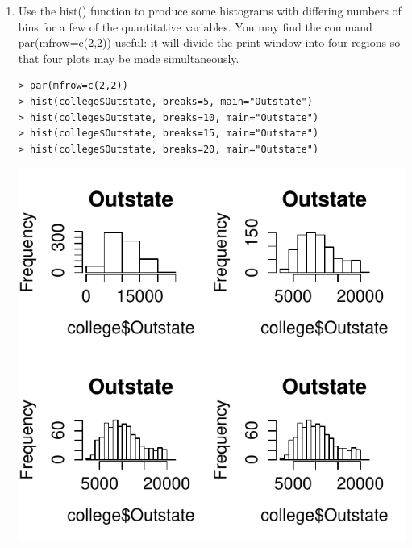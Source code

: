 \documentclass[11pt]{article}
\providecommand{\code}[1]{{\color{red}\ttfamily #1}}
\begin{document}
\begin{enumerate}
\begin{enumerate}
\begin{enumerate}
\item Use the \code{hist()} function to produce some histograms with differing numbers of bins for a few of the quantitative variables.  You may find the command \code{par(mfrow=c(2,2))} useful:  it will divide the print window into four regions so that four plots may be made simultaneously.

\begin{lstlisting}
> par(mfrow=c(2,2))
> hist(college$Outstate, breaks=5, main="Outstate")
> hist(college$Outstate, breaks=10, main="Outstate")
> hist(college$Outstate, breaks=15, main="Outstate")
> hist(college$Outstate, breaks=20, main="Outstate")
\end{lstlisting}
\begin{center}
\includegraphics[scale=.9]{plot3.pdf}
\end{center}


\end{enumerate}
\end{enumerate}
\end{enumerate}
\end{document}
